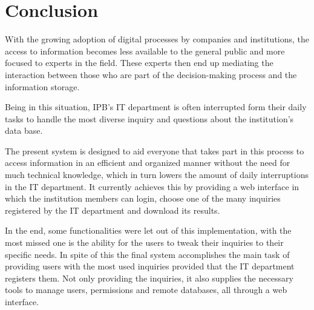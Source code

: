 \chapter{Conclusion}\label{conclusion}

With the growing adoption of digital processes by companies and institutions, the access to information becomes less available to the general public and more focused to experts in the field. These experts then end up mediating the interaction between those who are part of the decision-making process and the information storage.

Being in this situation, \gls{IPB}'s \gls{IT} department is often interrupted form their daily tasks to handle the most diverse inquiry and questions about the institution's data base.

The present system is designed to aid everyone that takes part in this process to access information in an efficient and organized manner without the need for much technical knowledge, which in turn lowers the amount of daily interruptions in the \gls{IT} department.
It currently achieves this by providing a web interface in which the institution members can login, choose one of the many inquiries registered by the \gls{IT} department and download its results.

In the end, some functionalities were let out of this implementation, with the most missed one is the ability for the users to tweak their inquiries to their specific needs.
In spite of this the final system accomplishes the main task of providing users with the most used inquiries provided that the \gls{IT} department registers them. Not only providing the inquiries, it also supplies the necessary tools to manage users, permissions and remote databases, all through a web interface.
